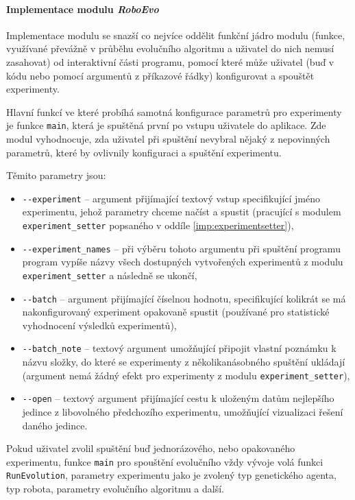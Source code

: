\paragraph{Implementace modulu \emph{RoboEvo}}
Implementace modulu se snazší co nejvíce oddělit funkční jádro modulu (funkce,
využívané převážně v průběhu evolučního algoritmu a uživatel do nich nemusí
zasahovat) od interaktivní části programu, pomocí které může uživatel (buď v
kódu nebo pomocí argumentů z příkazové řádky) konfigurovat a spouštět
experimenty. 

Hlavní funkcí ve které probíhá samotná konfigurace parametrů pro experimenty je
funkce \texttt{main}, která je spuštěná první po vstupu uživatele do aplikace.
Zde modul vyhodnocuje, zda uživatel při spuštění nevybral nějaký z nepovinných
parametrů, které by ovlivnily konfiguraci a spuštění experimentu. 

\pagebreak
Těmito parametry jsou:
\begin{itemize}
    \item \texttt{-{}-experiment} -- argument přijímající textový vstup
        specifikující jméno experimentu, jehož parametry chceme načíst a
        spustit (pracující s modulem \texttt{experiment\_setter} popsaného v
        oddíle \ref{imp:experimentsetter}),
    \item \texttt{-{}-experiment\_names} -- při výběru tohoto argumentu při
        spuštění programu program vypíše názvy všech dostupných vytvořených
        experimentů z modulu \texttt{experiment\_setter} a následně se ukončí,
    \item \texttt{-{}-batch} -- argument přijímající číselnou hodnotu,
        specifikující kolikrát se má nakonfigurovaný experiment opakovaně
        spustit (používané pro statistické vyhodnocení výsledků experimentů),
    \item \texttt{-{}-batch\_note} -- textový argument umožňující připojit
        vlastní poznámku k názvu složky, do které se experimenty z
        několikanásobného spuštění ukládají (argument nemá žádný efekt pro
        experimenty z modulu \texttt{experiment\_setter}),
    \item \texttt{-{}-open} -- textový argument přijímající cestu k uloženým
        datům nejlepšího jedince z libovolného předchozího experimentu,
        umožňující vizualizaci řešení daného jedince.
\end{itemize}

Pokud uživatel zvolil spuštění buď jednorázového, nebo opakovaného experimentu,
funkce \texttt{main} pro spouštění evolučního vždy vývoje volá funkci
\texttt{RunEvolution}, parametry experimentu jako je zvolený typ genetického
agenta, typ robota, parametry evolučního algoritmu a další.


